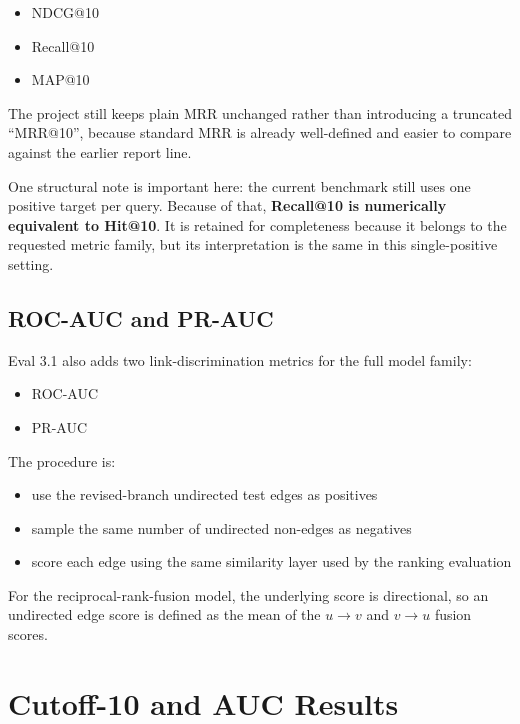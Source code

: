 \documentclass[11pt,a4paper]{article}
\begin{document}
\begin{itemize}
    \item NDCG@10
    \item Recall@10
    \item MAP@10
\end{itemize}

The project still keeps plain MRR unchanged rather than introducing a truncated
``MRR@10'', because standard MRR is already well-defined and easier to compare
against the earlier report line.

One structural note is important here: the current benchmark still uses one
positive target per query. Because of that, \textbf{Recall@10 is numerically
equivalent to Hit@10}. It is retained for completeness because it belongs to
the requested metric family, but its interpretation is the same in this
single-positive setting.

\subsection{ROC-AUC and PR-AUC}
Eval 3.1 also adds two link-discrimination metrics for the full model family:

\begin{itemize}
    \item ROC-AUC
    \item PR-AUC
\end{itemize}

The procedure is:

\begin{itemize}
    \item use the revised-branch undirected test edges as positives
    \item sample the same number of undirected non-edges as negatives
    \item score each edge using the same similarity layer used by the ranking
          evaluation
\end{itemize}

For the reciprocal-rank-fusion model, the underlying score is directional, so
an undirected edge score is defined as the mean of the $u \rightarrow v$ and
$v \rightarrow u$ fusion scores.

\section{Cutoff-10 and AUC Results}
\end{document}
